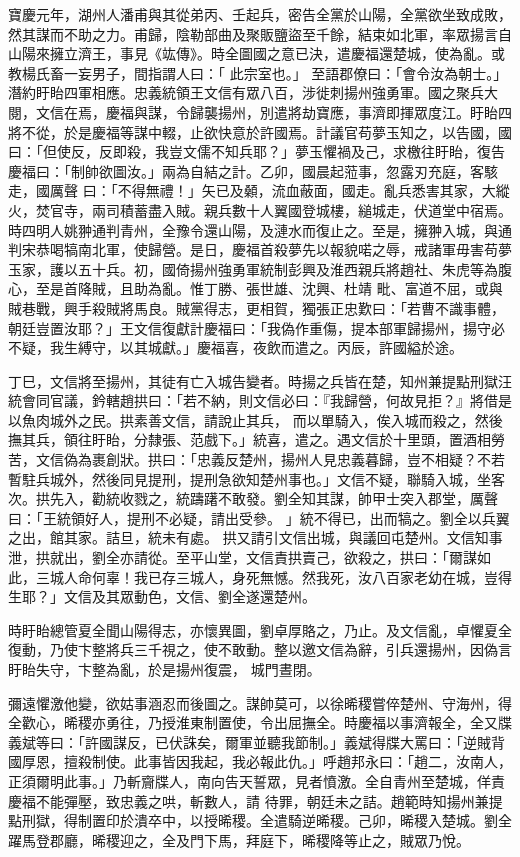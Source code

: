 \begin{pinyinscope}
 寶慶元年，湖州人潘甫與其從弟丙、壬起兵，密告全黨於山陽，全黨欲坐致成敗，然其謀而不助之力。甫歸，陰勒部曲及聚販鹽盜至千餘，結束如北軍，率眾揚言自山陽來擁立濟王，事見《竑傳》。時全圖國之意已決，遣慶福還楚城，使為亂。或教楊氏畜一妄男子，間指謂人曰：「
 此宗室也。」 至語郡僚曰：「會令汝為朝士。」潛約盱眙四軍相應。忠義統領王文信有眾八百，涉徙刺揚州強勇軍。國之聚兵大閱，文信在焉，慶福與謀，令歸襲揚州，別遣將劫寶應，事濟即揮眾度江。盱眙四將不從，於是慶福等謀中輟，止欲快意於許國焉。計議官苟夢玉知之，以告國，國曰：「但使反，反即殺，我豈文儒不知兵耶？」夢玉懼禍及己，求檄往盱眙，復告慶福曰：「制帥欲圖汝。」兩為自結之計。乙卯，國晨起蒞事，忽露刃充庭，客駭走，國厲聲
 曰：「不得無禮！」矢已及顙，流血蔽面，國走。亂兵悉害其家，大縱火，焚官寺，兩司積蓄盡入賊。親兵數十人翼國登城樓，縋城走，伏道堂中宿焉。時四明人姚翀通判青州，全豫令還山陽，及漣水而復止之。至是，擁翀入城，與通判宋恭喝犒南北軍，使歸營。是日，慶福首殺夢先以報貌喏之辱，戒諸軍毋害苟夢玉家，護以五十兵。初，國倚揚州強勇軍統制彭興及淮西親兵將趙社、朱虎等為腹心，至是首降賊，且助為亂。惟丁勝、張世雄、沈興、杜靖
 毗、富道不屈，或與賊巷戰，興手殺賊將馬良。賊黨得志，更相賀，獨張正忠歎曰：「若曹不識事體，朝廷豈置汝耶？」王文信復獻計慶福曰：「我偽作重傷，提本部軍歸揚州，揚守必不疑，我生縛守，以其城獻。」慶福喜，夜飲而遣之。丙辰，許國縊於途。



 丁巳，文信將至揚州，其徒有亡入城告變者。時揚之兵皆在楚，知州兼提點刑獄汪統會同官議，鈐轄趙拱曰：「若不納，則文信必曰：『我歸營，何故見拒？』將借是以魚肉城外之民。拱素善文信，請說止其兵，
 而以單騎入，俟入城而殺之，然後撫其兵，領往盱眙，分隸張、范戲下。」統喜，遣之。遇文信於十里頭，置酒相勞苦，文信偽為裹創狀。拱曰：「忠義反楚州，揚州人見忠義暮歸，豈不相疑？不若暫駐兵城外，然後同見提刑，提刑急欲知楚州事也。」文信不疑，聯騎入城，坐客次。拱先入，勸統收戮之，統躊躇不敢發。劉全知其謀，帥甲士突入郡堂，厲聲曰：「王統領好人，提刑不必疑，請出受參。 」統不得已，出而犒之。劉全以兵翼之出，館其家。詰旦，統未有處。
 拱又請引文信出城，與議回屯楚州。文信知事泄，拱就出，劉全亦請從。至平山堂，文信責拱賣己，欲殺之，拱曰：「爾謀如此，三城人命何辜！我已存三城人，身死無憾。然我死，汝八百家老幼在城，豈得生耶？」文信及其眾動色，文信、劉全遂還楚州。



 時盱眙總管夏全聞山陽得志，亦懷異圖，劉卓厚賂之，乃止。及文信亂，卓懼夏全復動，乃使卞整將兵三千視之，使不敢動。整以邀文信為辭，引兵還揚州，因偽言盱眙失守，卞整為亂，於是揚州復震，
 城門晝閉。



 彌遠懼激他變，欲姑事涵忍而後圖之。謀帥莫可，以徐晞稷嘗倅楚州、守海州，得全歡心，晞稷亦勇往，乃授淮東制置使，令出屈撫全。時慶福以事濟報全，全又牒義斌等曰：「許國謀反，已伏誅矣，爾軍並聽我節制。」義斌得牒大罵曰：「逆賊背國厚恩，擅殺制使。此事皆因我起，我必報此仇。」呼趙邦永曰：「趙二，汝南人，正須爾明此事。」乃斬齎牒人，南向告天誓眾，見者憤激。全自青州至楚城，佯責慶福不能彈壓，致忠義之哄，斬數人，請
 待罪，朝廷未之詰。趙範時知揚州兼提點刑獄，得制置印於潰卒中，以授晞稷。全遣騎逆晞稷。己卯，晞稷入楚城。劉全躍馬登郡廳，晞稷迎之，全及門下馬，拜庭下，晞稷降等止之，賊眾乃悅。




\end{pinyinscope}
